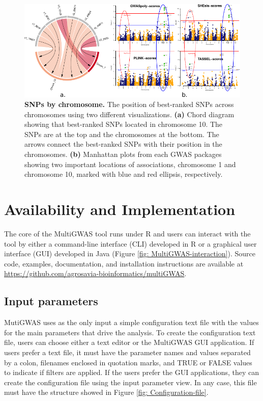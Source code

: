 \documentclass{article}
\begin{document}
\begin{figure}
\begin{centering}
\includegraphics{images/paper-chord-manhattans}
\par\end{centering}
\caption{\textbf{SNPs by chromosome.} The position of best-ranked SNPs across chromosomes using two different visualizations. \textbf{(a)} Chord diagram showing that best-ranked SNPs located in chromosome 10. The SNPs are at the top and the chromosomes at the bottom. The arrows connect the best-ranked SNPs with their position in the chromosomes. \textbf{(b)} Manhattan plots from each GWAS packages showing two important locations of associations, chromosome 1 and chromosome 10, marked with blue and red ellipsis, respectively. \label{fig:Chord-diagrams}}
\end{figure}

\section{Availability and Implementation}

The core of the MultiGWAS tool runs under R and users can interact with the tool by either a command-line interface (CLI) developed in
R or a graphical user interface (GUI) developed in Java (Figure \ref{fig: MultiGWAS-interaction}).
Source code, examples, documentation, and installation instructions are available at \url{https://github.com/agrosavia-bioinformatics/multiGWAS}. 

\subsection{Input parameters}

MutiGWAS uses as the only input a simple configuration text file with the values for the main parameters that drive the analysis. To create the configuration text file, users can choose either a text editor or the MultiGWAS GUI application.  If users prefer a text file, it must have the parameter names and values separated by a colon, filenames enclosed in quotation marks, and TRUE or FALSE values to indicate if filters are applied. If the users prefer the GUI applications, they can create the configuration file using the input parameter view. In any case, this file must have the structure showed in Figure \ref{fig: Configuration-file}.
\end{document}
